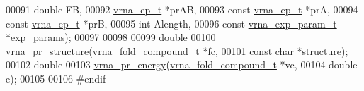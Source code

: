 \begin{DoxyCode}
00091                           \textcolor{keywordtype}{double}                  FB,
00092                           \mbox{\hyperlink{group__struct__utils_structvrna__elem__prob__s}{vrna\_ep\_t}}               *prAB,
00093                           \textcolor{keyword}{const} \mbox{\hyperlink{group__struct__utils_structvrna__elem__prob__s}{vrna\_ep\_t}}         *prA,
00094                           \textcolor{keyword}{const} \mbox{\hyperlink{group__struct__utils_structvrna__elem__prob__s}{vrna\_ep\_t}}         *prB,
00095                           \textcolor{keywordtype}{int}                     Alength,
00096                           \textcolor{keyword}{const} \mbox{\hyperlink{group__energy__parameters_structvrna__exp__param__s}{vrna\_exp\_param\_t}}  *exp\_params);
00097 
00098 
00099 \textcolor{keywordtype}{double}
00100 \mbox{\hyperlink{equilibrium__probs_8h_a882c35d9dd775c1275593b3b6a966bec}{vrna\_pr\_structure}}(\mbox{\hyperlink{group__fold__compound_structvrna__fc__s}{vrna\_fold\_compound\_t}} *fc,
00101                   \textcolor{keyword}{const} \textcolor{keywordtype}{char} *structure);
00102 \textcolor{keywordtype}{double}
00103 \mbox{\hyperlink{equilibrium__probs_8h_aa88e17336daede0e6db4da1f3252c031}{vrna\_pr\_energy}}(\mbox{\hyperlink{group__fold__compound_structvrna__fc__s}{vrna\_fold\_compound\_t}} *vc,
00104                \textcolor{keywordtype}{double} e);
00105 
00106 \textcolor{preprocessor}{#endif}
\end{DoxyCode}
